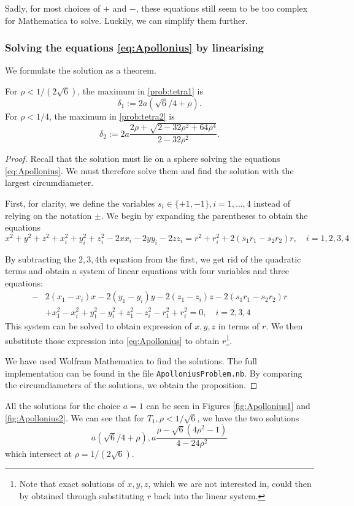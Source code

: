 Sadly, for most choices of $+$ and $-$, these equations still seem to be too complex for Mathematica to solve. Luckily, we can simplify them further. 

\subsubsection{Solving the equations \ref{eq:Apollonius} by linearising}

We formulate the solution as a theorem.
\begin{theorem}\label{thm:Apollonius}
	For $\rho < 1/(2\sqrt 6)$, the maximum in \ref{prob:tetra1} is
	$$\delta_1 := 2a(\sqrt 6/4 + \rho).$$
	For $\rho < 1/4$, the maximum in \ref{prob:tetra2} is
	$$\delta_2 := 2a \frac{2\rho + \sqrt{2 - 32\rho^2 + 64 \rho^4}}{2-32\rho^2}.$$

\end{theorem}
\begin{proof}
	Recall that the solution must lie on a sphere solving the equations \ref{eq:Apollonius}. We must therefore solve them and find the solution with the largest circumdiameter.

First, for clarity, we define the variables $s_i\in\{+1,-1\},i=1,\dots,4$ instead of relying on the notation $\pm$. We begin by expanding the parentheses to obtain the equations
$$x^2+y^2+z^2 + x_i^2 + y_i^2 + z_i^2 - 2xx_i - 2yy_i - 2zz_i = r^2 + r_i^2 + 2(s_1 r_1 - s_2 r_2)r,\quad i=1,2,3,4$$

By subtracting the $2,3,4$th equation from the first, we get rid of the quadratic terms and obtain a system of linear equations with four variables and three equations:
\begin{align*}-&2(x_1-x_i)x - 2(y_1-y_i)y -2 (z_1-z_i)z - 2(s_1r_1 - s_2r_2)r \\
	& + x_1^2-x_i^2 + y_1^2-y_i^2 + z_1^2 - z_i^2 -r_1^2 + r_i^2 = 0, \quad i=2,3,4
\end{align*}
This system can be solved to obtain expression of $x,y,z$ in terms of $r$. We then substitute those expression into \ref{eq:Apollonius} to obtain $r$\footnote{Note that exact solutions of $x,y,z$, which we are not interested in, could then by obtained through substituting $r$ back into the linear system.}. 

We have used Wolfram Mathematica \cite{Mathematica} to find the solutions. The full implementation can be found in the file \texttt{ApolloniusProblem.nb}. By comparing the circumdiameters of the solutions, we obtain the proposition.

\end{proof}
All the solutions for the choice $a=1$ can be seen in Figures \ref{fig:Apollonius1} and \ref{fig:Apollonius2}. We can see that for $T_1, \rho < 1/\sqrt 6$, we have the two solutions
$$a(\sqrt 6 / 4 + \rho), a \frac{\rho - \sqrt 6 (4\rho^2 - 1)}{4-24 \rho^2}$$
which intersect at $\rho =1/(2\sqrt 6)$. 

